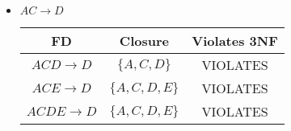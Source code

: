 \documentclass[12pt,letterpaper]{article}
\begin{document}
\begin{enumerate}
\begin{enumerate}
\begin{itemize}
            \item $AC \rightarrow D$

              \begin{tabular}{c | c | c |}
                FD                    & Closure             & Violates 3NF \\
                \hline
                $ACD \rightarrow D$   & $\{A, C, D\}$       & VIOLATES \\
                \hline
                $ACE \rightarrow D$   & $\{A, C, D, E\}$    & VIOLATES \\
                \hline
                $ACDE \rightarrow D$  & $\{A, C, D, E\}$    & VIOLATES \\
                \hline
              \end{tabular}
          \end{itemize}


      \end{enumerate}
  \end{enumerate}
\end{document}
